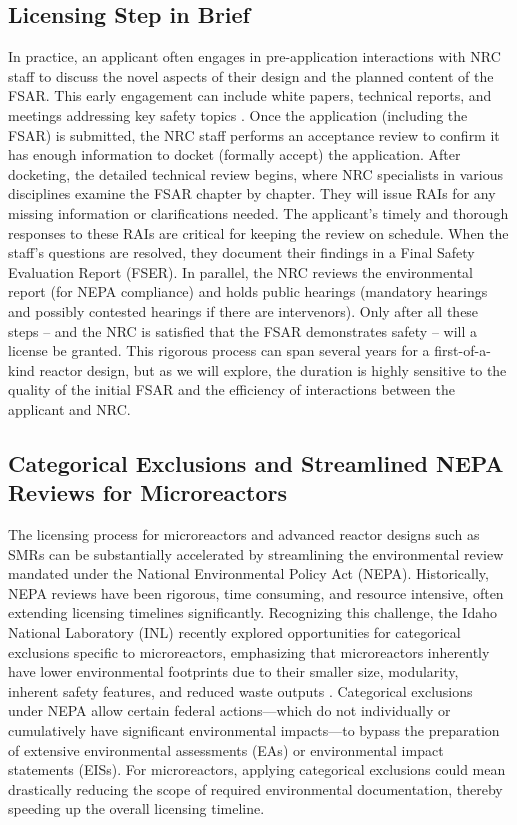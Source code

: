 \documentclass[5p,authoryear]{elsarticle}
\begin{document}
\subsection{Licensing Step in Brief}
\vspace{0.2cm}

In practice, an applicant often engages in pre-application interactions with NRC staff to discuss the novel aspects of their design and the planned content of the FSAR. This early engagement can include white papers, technical reports, and meetings addressing key safety topics \cite{NIA2024}. Once the application (including the FSAR) is submitted, the NRC staff performs an acceptance review to confirm it has enough information to docket (formally accept) the application. After docketing, the detailed technical review begins, where NRC specialists in various disciplines examine the FSAR chapter by chapter. They will issue RAIs for any missing information or clarifications needed. The applicant’s timely and thorough responses to these RAIs are critical for keeping the review on schedule. When the staff’s questions are resolved, they document their findings in a Final Safety Evaluation Report (FSER). In parallel, the NRC reviews the environmental report (for NEPA compliance) and holds public hearings (mandatory hearings and possibly contested hearings if there are intervenors). Only after all these steps – and the NRC is satisfied that the FSAR demonstrates safety – will a license be granted. This rigorous process can span several years for a first-of-a-kind reactor design, but as we will explore, the duration is highly sensitive to the quality of the initial FSAR and the efficiency of interactions between the applicant and NRC.

\subsection{Categorical Exclusions and Streamlined NEPA Reviews for Microreactors}
\vspace{0.2cm}

The licensing process for microreactors and advanced reactor designs such as SMRs can be substantially accelerated by streamlining the environmental review mandated under the National Environmental Policy Act (NEPA). Historically, NEPA reviews have been rigorous, time consuming, and resource intensive, often extending licensing timelines significantly. Recognizing this challenge, the Idaho National Laboratory (INL) recently explored opportunities for categorical exclusions specific to microreactors, emphasizing that microreactors inherently have lower environmental footprints due to their smaller size, modularity, inherent safety features, and reduced waste outputs \cite{inl2025categorical}. Categorical exclusions under NEPA allow certain federal actions—which do not individually or cumulatively have significant environmental impacts—to bypass the preparation of extensive environmental assessments (EAs) or environmental impact statements (EISs). For microreactors, applying categorical exclusions could mean drastically reducing the scope of required environmental documentation, thereby speeding up the overall licensing timeline.\\
\end{document}
